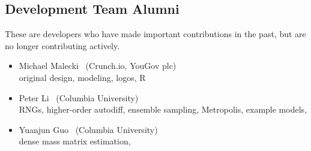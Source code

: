 \subsection*{Development Team Alumni}

These are developers who have made important contributions in the
past, but are no longer contributing actively.

\begin{itemize}
\item Michael Malecki \ (Crunch.io, YouGov plc)
\\ {\footnotesize original design, modeling, logos, R}
\item Peter Li \   (Columbia University)
\\ {\footnotesize RNGs, higher-order autodiff, ensemble sampling,
  Metropolis, example models, \Cpp}
\item Yuanjun Guo \ (Columbia University)
\\ {\footnotesize dense mass matrix estimation, \Cpp}
\end{itemize}

